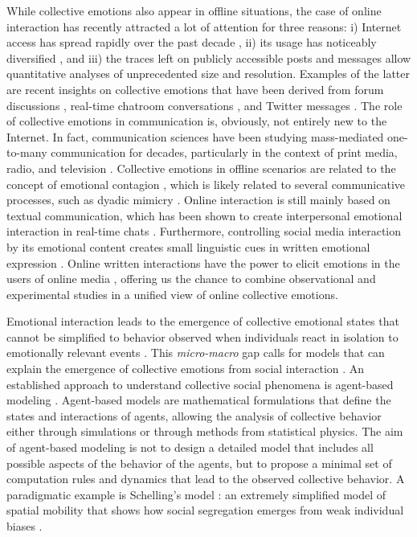 \documentclass[nologo,url,11pt,a4paper]{ETHpaper}
\begin{document}
While collective emotions also appear in offline situations, the case of online interaction has recently attracted a lot of attention for three reasons: i) Internet access has spread rapidly over the past decade \cite{Duggan2013}, ii) its usage has noticeably diversified \cite{Deursen2014}, and iii) the traces left on publicly accessible posts and messages allow quantitative analyses of unprecedented size and resolution.
Examples of the latter are recent insights on collective emotions that have been derived from forum discussions \cite{Chmiel2011}, real-time chatroom conversations \cite{Garas2012}, and Twitter messages \cite{Thelwall2011}.
The role of collective emotions in communication is, obviously, not entirely new to the Internet. 
In fact, communication sciences have been studying mass-mediated one-to-many communication for decades, particularly in the context of print media, radio, and television \cite{Roberts1981}. 
Collective emotions in offline scenarios are related to the  concept of emotional contagion \cite{Hatfield1994}, 
which is likely related to several communicative processes, such as dyadic mimicry
\cite{Hess2013}. 
Online interaction is still mainly based on textual communication, which has been shown to create interpersonal emotional interaction in real-time chats \cite{Garas2012}.
Furthermore, controlling social media interaction by its emotional content creates small linguistic cues in written emotional expression \cite{Kramer2014}. 
Online written interactions have the power to elicit emotions in the users of online media \cite{Kappas2011}, offering us the chance to combine observational and experimental studies in a unified view of online collective emotions.

Emotional interaction leads to the emergence of collective emotional states that cannot be simplified to behavior observed when individuals react in isolation to emotionally relevant events \cite{Kappas2013}. 
This \emph{micro-macro} gap calls for models that can explain the emergence of collective emotions from social interaction \cite{Kuester2013}.  
An established approach to understand collective social phenomena is agent-based modeling \cite{Schweitzer2003}.
Agent-based models are mathematical formulations that define the states and interactions of agents, allowing the analysis of collective behavior either through simulations or through methods from statistical physics.
The aim of agent-based modeling is not to design a detailed model that includes all possible aspects of the behavior of the agents, but to propose a minimal set of computation rules and dynamics that lead to the observed collective behavior.
A paradigmatic example is Schelling's model \cite{Schelling1971}: an extremely simplified model of spatial mobility that shows how 
social segregation emerges from weak individual biases \cite{Ball2007}.
\end{document}
